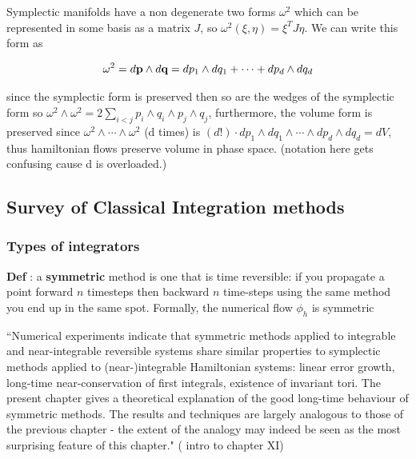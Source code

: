 \documentclass[12pt]{article}
\begin{document}

Symplectic manifolds have a non degenerate two forms $\omega^2$ which can be represented in some basis as a matrix $J$, so $\omega^2(\xi,\eta) = \xi^TJ\eta$. We can write this form as

$$\omega^2 = d\textbf p \wedge d\textbf q = dp_1\wedge dq_1 + \cdots + d p_d\wedge dq_d$$

since the symplectic form is preserved then so are the wedges of the symplectic form so $\omega^2\wedge\omega^2 = 2\sum_{i<j}p_i\wedge q_i\wedge p_j\wedge q_j$, furthermore, the volume form is preserved since $\omega^2\wedge \cdots \wedge \omega^2$ (d times) is $(d!) \cdot dp_1\wedge dq_1\wedge \cdots \wedge dp_d\wedge dq_d = dV$, thus hamiltonian flows preserve volume in phase space. (notation here gets confusing cause d is overloaded.) 


\subsection{Survey of Classical Integration methods}
\subsubsection{Types of integrators}

\textbf{Def} : a \textbf{symmetric} method is one that is time reversible: if you propagate a point forward $n$ timesteps then backward $n$ time-steps using the same method you end up in the same spot. Formally, the numerical flow $\phi_h$ is symmetric  

``Numerical experiments indicate that symmetric methods applied to integrable and near-integrable reversible systems share similar properties to symplectic methods applied to (near-)integrable Hamiltonian systems: linear error growth, long-time near-conservation of first integrals, existence of invariant tori. The present chapter gives a theoretical explanation of the good long-time behaviour of symmetric methods. The results and techniques are largely analogous to those of the previous chapter - the extent of the analogy may indeed be seen as the most surprising feature of this chapter." (\cite{Numerical} intro to chapter XI)
\end{document}
